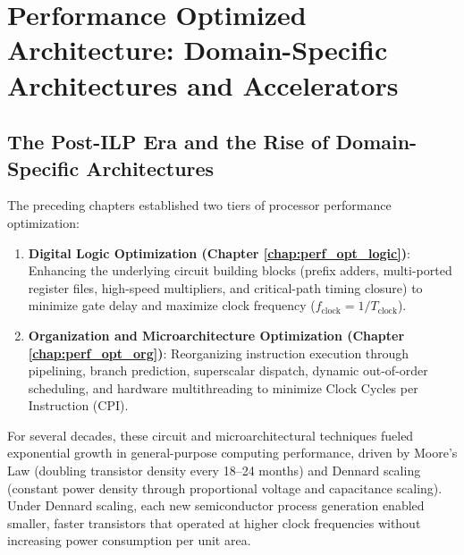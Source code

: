 \chapter{Performance Optimized Architecture: Domain-Specific Architectures and Accelerators}\label{chap:dsa_architecture}
\localtoc

\section{The Post-ILP Era and the Rise of Domain-Specific Architectures}\label{sec:post_ilp_dsa}

The preceding chapters established two tiers of processor performance optimization:
\begin{enumerate}
    \item \textbf{Digital Logic Optimization (Chapter \ref{chap:perf_opt_logic})}: Enhancing the underlying circuit building blocks (prefix adders, multi-ported register files, high-speed multipliers, and critical-path timing closure) to minimize gate delay and maximize clock frequency ($f_{\text{clock}} = 1/T_{\text{clock}}$).
    \item \textbf{Organization and Microarchitecture Optimization (Chapter \ref{chap:perf_opt_org})}: Reorganizing instruction execution through pipelining, branch prediction, superscalar dispatch, dynamic out-of-order scheduling, and hardware multithreading to minimize Clock Cycles per Instruction ($\text{CPI}$).
\end{enumerate}

For several decades, these circuit and microarchitectural techniques fueled exponential growth in general-purpose computing performance, driven by Moore's Law (doubling transistor density every 18--24 months) and Dennard scaling (constant power density through proportional voltage and capacitance scaling). Under Dennard scaling, each new semiconductor process generation enabled smaller, faster transistors that operated at higher clock frequencies without increasing power consumption per unit area.

